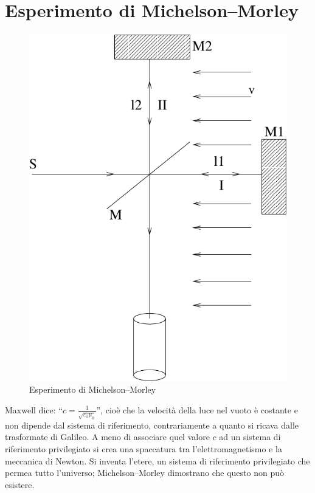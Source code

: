 \section{Esperimento di Michelson--Morley}
\begin{figure}[htbp]
\centering
\includegraphics[scale=0.7]{immagini/fisica1/Morley}
\caption{Esperimento di Michelson--Morley}
\end{figure}
Maxwell dice: ``$c=\frac{1}{\sqrt{\varepsilon_0\mu_0}}$'', cioè che la velocità della luce nel vuoto è costante e non dipende dal sistema di riferimento, contrariamente a quanto si ricava dalle trasformate di Galileo. A meno di associare quel valore $c$ ad un sistema di riferimento privilegiato si crea una spaccatura tra l'elettromagnetismo e la meccanica di Newton. Si inventa l'etere, un sistema di riferimento privilegiato che permea tutto l'universo; Michelson--Morley dimostrano che questo non può esistere.


